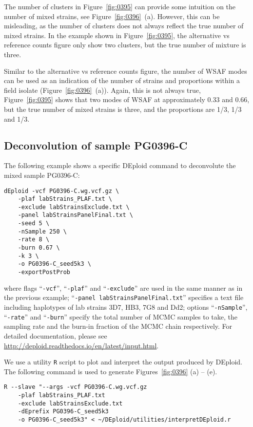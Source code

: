 \documentclass{article}
\begin{document}
The number of clusters in Figure~\ref{fig:0395} can provide some intuition on the number of mixed strains, see Figure~\ref{fig:0396}~(a). However, this can be misleading, as the number of clusters does not always reflect the true number of mixed strains. In the example shown in Figure~\ref{fig:0395}, the alternative vs reference counts figure only show two clusters, but the true number of mixture is three.

Similar to the alternative vs reference counts figure, the number of WSAF modes can be used as an indication of the number of strains and proportions within a field isolate (Figure~\ref{fig:0396}~(a)). Again, this is not always true, Figure~\ref{fig:0395} shows that two modes of WSAF at approximately 0.33 and 0.66, but the true number of mixed strains is three, and the proportions are 1/3, 1/3 and 1/3.


\subsection{Deconvolution of sample {\textmd PG0396-C}}
The following example shows a specific {\textmd DEploid} command to deconvolute the mixed sample {\textmd PG0396-C}:
\linespread{1}
\begin{lstlisting}
dEploid -vcf PG0396-C.wg.vcf.gz \
    -plaf labStrains_PLAF.txt \
    -exclude labStrainsExclude.txt \
    -panel labStrainsPanelFinal.txt \
    -seed 5 \
    -nSample 250 \
    -rate 8 \
    -burn 0.67 \
    -k 3 \
    -o PG0396-C_seed5k3 \
    -exportPostProb
\end{lstlisting}
\linespread{1.5}
where flags ``{\tt -vcf}'', ``{\tt -plaf}'' and ``{\tt -exclude}'' are used in the same manner as in the previous example; ``{\tt -panel labStrainsPanelFinal.txt}'' specifies a text file including haplotypes of lab strains 3D7, HB3, 7G8 and Dd2; options ``{\tt -nSample}'', ``{\tt -rate}'' and ``{\tt -burn}'' specify the total number of MCMC samples to take, the sampling rate and the burn-in fraction of the MCMC chain respectively. For detailed documentation, please see \url{http://deploid.readthedocs.io/en/latest/input.html}.


We use a utility {\tt R} script to plot and interpret the output produced by DEploid. The following command is used to generate Figures~\ref{fig:0396} (a) -- (e).
\linespread{1}
\begin{lstlisting}
R --slave "--args -vcf PG0396-C.wg.vcf.gz
    -plaf labStrains_PLAF.txt
    -exclude labStrainsExclude.txt
    -dEprefix PG0396-C_seed5k3
    -o PG0396-C_seed5k3" < ~/DEploid/utilities/interpretDEploid.r
\end{lstlisting}
\linespread{1.5}
\end{document}
